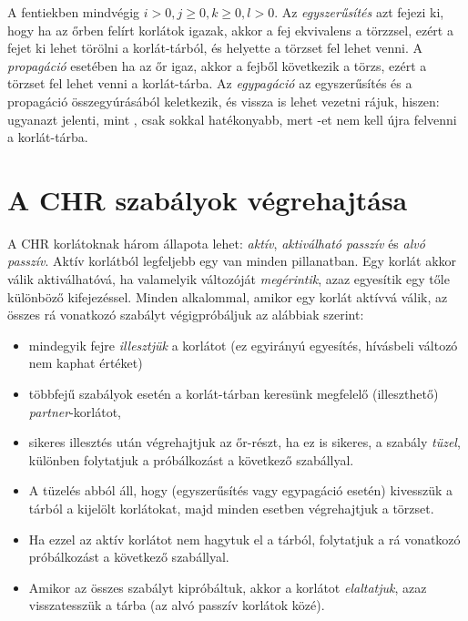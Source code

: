 A fentiekben mindvégig $i > 0, j \geq 0, k \geq 0, l > 0$.
\br
Az \emph{egyszerűsítés} azt fejezi ki, hogy ha az őrben felírt korlátok igazak, akkor
a fej ekvivalens a törzzsel, ezért a fejet ki lehet törölni a korlát-tárból, és helyette
a törzset fel lehet venni. A \emph{propagáció} esetében ha az őr igaz, akkor a fejből
következik a törzs, ezért a törzset fel lehet venni a korlát-tárba. Az \emph{egypagáció}
az egyszerűsítés és a propagáció összegyúrásából keletkezik, és vissza is lehet vezetni
rájuk, hiszen:  ugyanazt jelenti, mint
, csak sokkal hatékonyabb, mert -et
nem kell újra felvenni a korlát-tárba.

\section{A CHR szabályok végrehajtása}

A CHR korlátoknak három állapota lehet: \emph{aktív}, \emph{aktiválható passzív} és
\emph{alvó passzív}. Aktív korlátból legfeljebb egy van minden pillanatban. Egy
korlát akkor válik aktiválhatóvá, ha valamelyik változóját \emph{megérintik}, azaz
egyesítik egy tőle különböző kifejezéssel. Minden alkalommal, amikor egy korlát aktívvá
válik, az összes rá vonatkozó szabályt végigpróbáljuk az alábbiak szerint:

\begin{itemize}
\item mindegyik fejre \emph{illesztjük} a korlátot (ez egyirányú egyesítés,
hívásbeli változó nem kaphat értéket)
\item többfejű szabályok esetén a korlát-tárban keresünk megfelelő
(illeszthető) \emph{partner}-korlátot,
\item sikeres illesztés után végrehajtjuk az őr-részt, ha ez is sikeres, a
szabály \emph{tüzel}, különben folytatjuk a próbálkozást a következő szabállyal.
\item A tüzelés abból áll, hogy (egyszerűsítés vagy egypagáció esetén)
kivesszük a tárból a kijelölt korlátokat, majd minden esetben végrehajtjuk a törzset.
\item Ha ezzel az aktív korlátot nem hagytuk el a tárból, folytatjuk a rá vonatkozó
próbálkozást a következő szabállyal.
\item Amikor az összes szabályt kipróbáltuk, akkor a korlátot \emph{elaltatjuk}, azaz
visszatesszük a tárba (az alvó passzív korlátok közé).
\end{itemize}

